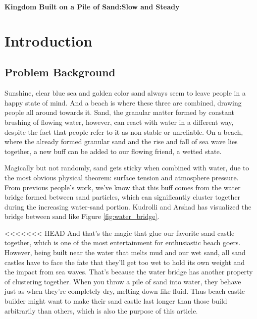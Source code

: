 \documentclass[12pt]{article}
\begin{document}
\clearpage
\pagestyle{fancy}


\begin{center}
    \Large \textbf{Kingdom Built on a Pile of Sand:Slow and Steady}
\end{center}

\newpage

\tableofcontents
\newpage
\setcounter{page}{1}

\section{Introduction}
\subsection{Problem Background}
\par
Sunshine, clear blue sea and golden color sand always seem to leave people in a happy state of mind.
And a beach is where these three are combined, drawing people all around towards it. Sand, the granular matter formed by constant brushing of flowing water, however, can react with water in a different way, despite the fact that people refer to it as non-stable or unreliable. On a beach, where the already formed granular sand and the rise and fall of sea wave lies together, a new buff can be added to our flowing friend, a wetted state.
\par
Magically but not randomly, sand gets sticky when combined with water, due to the most obvious physical theorem: surface tension and atmosphere pressure. From previous people's work, we've know that this buff comes from the water bridge formed between sand particles, which can significantly cluster together during the increasing water-sand portion\autocite{pakpour2012construct,mitarai2006wet,kudrolli2008sticky}. Kudrolli and Arshad has visualized the bridge between sand like Figure \ref{fig:water_bridge}.
\par
<<<<<<< HEAD
And that's the magic that glue our favorite sand castle together, which is one of the most entertainment for enthusiastic beach goers. However, being built near the water that melts mud and our wet sand, all sand castles have to face the fate that they'll get too wet to hold its own weight and the impact from sea waves. That's because the water bridge has another property of clustering together\autocite{kudrolli2008sticky}. When you throw a pile of sand into water, they behave just as when they're completely dry, melting down like fluid. Thus beach castle builder might want to make their sand castle last longer than those build arbitrarily than others, which is also the purpose of this article.
\end{document}

